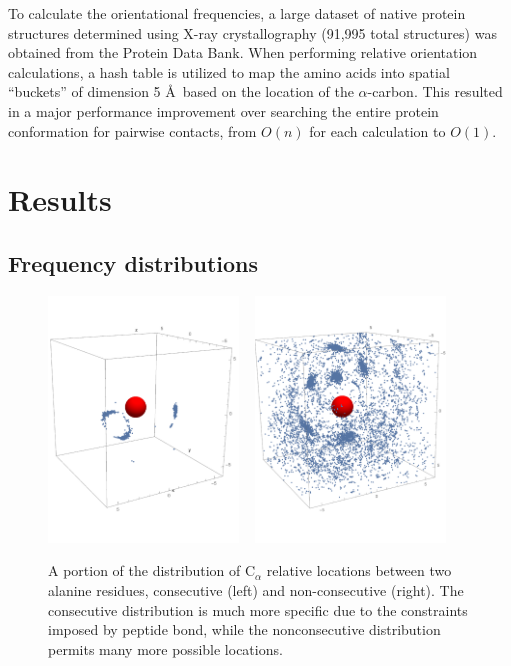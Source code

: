 \documentclass[11pt,titlepage]{article}
\begin{document}
To calculate the orientational frequencies, a large dataset of native protein structures determined using X-ray crystallography (91,995 total structures) was obtained from the Protein Data Bank.
When performing relative orientation calculations, a hash table is utilized to map the amino acids into spatial ``buckets'' of dimension 5 \AA\, based on the location of the $\alpha$-carbon.
This resulted in a major performance improvement over searching the entire protein conformation for pairwise contacts, from $O(n)$ for each calculation to $O(1)$.

\section{Results}
\subsection{Frequency distributions}
\begin{figure}
	\begin{center}
		\includegraphics[trim={0 3cm 0 3cm}, clip=true, width=0.45\textwidth]{consec_alpha_frequencies}\,\,\,\,\,
		\includegraphics[trim={0 3cm 0 3cm}, clip=true, width=0.45\textwidth]{nonconsec_alpha_frequencies}
		\caption{A portion of the distribution of C$_\alpha$ relative locations between two alanine residues, consecutive (left) and non-consecutive (right). The consecutive distribution is much more specific due to the constraints imposed by peptide bond, while the nonconsecutive distribution permits many more possible locations.}
		\label{alpha_frequencies}
	\end{center}
\end{figure}
\end{document}
